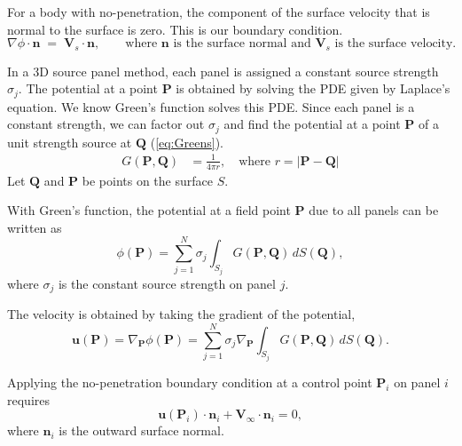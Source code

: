 \documentclass[conf]{new-aiaa} %
\begin{document}
For a body with no-penetration, the component of the surface velocity that is normal to the surface is zero. This is our boundary condition.
\begin{equation}
\nabla \phi \cdot \mathbf{n} 
\;=\; \mathbf{V}_s \cdot \mathbf{n},
\qquad \text{where $\mathbf{n}$ is the surface normal and $\mathbf{V}_s$ is the surface velocity.}
\label{eq:bc}
\end{equation}

In a 3D source panel method, each panel is assigned a constant source strength $\sigma_j$.
The potential at a point $\mathbf{P}$ is obtained by solving the PDE given by Laplace's equation. 
We know Green's function solves this PDE.
Since each panel is a constant strength, we can factor out $\sigma_j$ and find the potential at a point $\mathbf{P}$ of a unit strength source at $\mathbf{Q}$ (\autoref{eq:Greens}).
\begin{align}
G(\mathbf{P},\mathbf{Q}) &= \frac{1}{4\pi r}, 
\quad \text{where } r = \lvert \mathbf{P} - \mathbf{Q} \rvert 
\label{eq:Greens}
\end{align}
\noindent Let $\mathbf{Q}$ and $\mathbf{P}$ be points on the surface $S$.
\vspace{1em}

With Green's function, the potential at a field point $\mathbf{P}$ due to all panels can be written as
\begin{equation}
\phi(\mathbf{P}) = \sum_{j=1}^N \sigma_j \int_{S_j} G(\mathbf{P}, \mathbf{Q}) \, dS(\mathbf{Q}),
\label{eq:potential_sum}
\end{equation}
where $\sigma_j$ is the constant source strength on panel $j$.
\vspace{1em}

The velocity is obtained by taking the gradient of the potential,
\begin{equation}
\mathbf{u}(\mathbf{P}) = \nabla_{\mathbf{P}} \phi(\mathbf{P})
= \sum_{j=1}^N \sigma_j \nabla_{\mathbf{P}}
\int_{S_j} G(\mathbf{P}, \mathbf{Q}) \, dS(\mathbf{Q}).
\end{equation}

Applying the no-penetration boundary condition at a control point $\mathbf{P}_i$ on panel $i$ requires
\begin{equation}
\mathbf{u}(\mathbf{P}_i) \cdot \mathbf{n}_i + \mathbf{V}_\infty \cdot \mathbf{n}_i = 0,
\label{eq:boundary}
\end{equation}
where $\mathbf{n}_i$ is the outward surface normal.
\vspace{1em}
\end{document}
